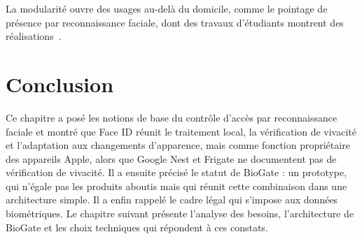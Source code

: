 La modularité ouvre des usages au-delà du domicile, comme le pointage de présence par reconnaissance faciale, dont des travaux d'étudiants montrent des réalisations~\cite{yadav2025}.

\section*{Conclusion}

Ce chapitre a posé les notions de base du contrôle d'accès par reconnaissance faciale et montré que Face ID réunit le traitement local, la vérification de vivacité et l'adaptation aux changements d'apparence, mais comme fonction propriétaire des appareils Apple, alors que Google Nest et Frigate ne documentent pas de vérification de vivacité. Il a ensuite précisé le statut de BioGate : un prototype, qui n'égale pas les produits aboutis mais qui réunit cette combinaison dans une architecture simple. Il a enfin rappelé le cadre légal qui s'impose aux données biométriques. Le chapitre suivant présente l'analyse des besoins, l'architecture de BioGate et les choix techniques qui répondent à ces constats.
